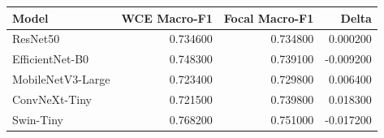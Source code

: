 \begin{tabular}{lrrr}
\toprule
Model & WCE Macro-F1 & Focal Macro-F1 & Delta \\
\midrule
ResNet50 & 0.734600 & 0.734800 & 0.000200 \\
EfficientNet-B0 & 0.748300 & 0.739100 & -0.009200 \\
MobileNetV3-Large & 0.723400 & 0.729800 & 0.006400 \\
ConvNeXt-Tiny & 0.721500 & 0.739800 & 0.018300 \\
Swin-Tiny & 0.768200 & 0.751000 & -0.017200 \\
\bottomrule
\end{tabular}
